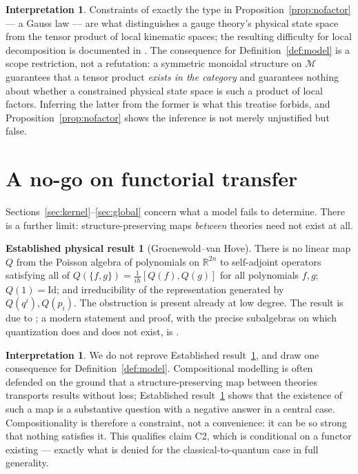 \documentclass[11pt]{article}
\theoremstyle{definition}
\newtheorem{interpretation}[definition]{Interpretation}
\newtheorem{established}[definition]{Established physical result}
\begin{document}
\begin{interpretation}
\label{int:nofactor}
Constraints of exactly the type in Proposition~\ref{prop:nofactor} --- a Gauss
law --- are what distinguishes a gauge theory's physical state space from the
tensor product of local kinematic spaces; the resulting difficulty for local
decomposition is documented in \cite{CHR}. The consequence for
Definition~\ref{def:model} is a scope restriction, not a refutation: a symmetric
monoidal structure on $\mathcal M$ guarantees that a tensor product
\emph{exists in the category} and guarantees nothing about whether a constrained
physical state space is such a product of local factors. Inferring the latter
from the former is what this treatise forbids, and
Proposition~\ref{prop:nofactor} shows the inference is not merely unjustified
but false.
\end{interpretation}

\section{A no-go on functorial transfer}
\label{sec:nogo}

Sections~\ref{sec:kernel}--\ref{sec:global} concern what a model fails to
determine. There is a further limit: structure-preserving maps \emph{between}
theories need not exist at all.

\begin{established}[Groenewold--van Hove]
\label{est:gvh}
There is no linear map $Q$ from the Poisson algebra of polynomials on
$\mathbb R^{2n}$ to self-adjoint operators satisfying all of
$Q(\{f,g\})=\tfrac{1}{i\hbar}[Q(f),Q(g)]$ for all polynomials $f,g$;
$Q(1)=\mathrm{Id}$; and irreducibility of the representation generated by
$Q(q^i),Q(p_i)$. The obstruction is present already at low degree. The result is
due to \cite{Groenewold,vanHove}; a modern statement and proof, with the precise
subalgebras on which quantization does and does not exist, is \cite{Gotay}.
\end{established}

\begin{interpretation}
\label{int:nogo}
We do not reprove Established result~\ref{est:gvh}, and draw one consequence for
Definition~\ref{def:model}. Compositional modelling is often defended on the
ground that a structure-preserving map between theories transports results
without loss; Established result~\ref{est:gvh} shows that the existence of such
a map is a substantive question with a negative answer in a central case.
Compositionality is therefore a constraint, not a convenience: it can be so
strong that nothing satisfies it. This qualifies claim C2, which is conditional
on a functor existing --- exactly what is denied for the classical-to-quantum
case in full generality.
\end{interpretation}
\end{document}
